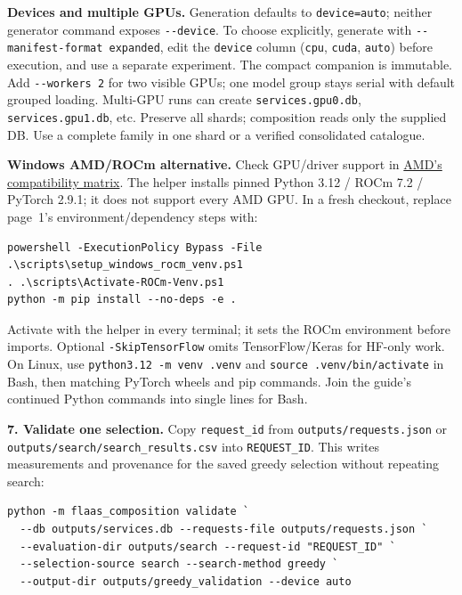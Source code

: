 \documentclass[10pt,a4paper]{article}
\newcommand{\code}[1]{\nolinkurl{#1}}
\newcommand{\lead}[1]{\par\smallskip\noindent\textbf{#1}\enspace}
\begin{document}
\lead{Devices and multiple GPUs.} Generation defaults to \code{device=auto}; neither generator command exposes \code{--device}. To choose explicitly, generate with \code{--manifest-format expanded}, edit the \code{device} column (\code{cpu}, \code{cuda}, \code{auto}) before execution, and use a separate experiment. The compact companion is immutable. Add \code{--workers 2} for two visible GPUs; one model group stays serial with default grouped loading. Multi-GPU runs can create \code{services.gpu0.db}, \code{services.gpu1.db}, etc. Preserve all shards; composition reads only the supplied DB. Use a complete family in one shard or a verified consolidated catalogue.

\lead{Windows AMD/ROCm alternative.} Check GPU/driver support in \href{https://rocm.docs.amd.com/projects/radeon-ryzen/en/latest/docs/compatibility/compatibilityrad/windows/windows_compatibility.html}{AMD's compatibility matrix}. The helper installs pinned Python 3.12 / ROCm 7.2 / PyTorch 2.9.1; it does not support every AMD GPU. In a fresh checkout, replace page~1's environment/dependency steps with:
\begin{lstlisting}
powershell -ExecutionPolicy Bypass -File .\scripts\setup_windows_rocm_venv.ps1
. .\scripts\Activate-ROCm-Venv.ps1
python -m pip install --no-deps -e .
\end{lstlisting}
Activate with the helper in every terminal; it sets the ROCm environment before imports. Optional \code{-SkipTensorFlow} omits TensorFlow/Keras for HF-only work. On Linux, use \code{python3.12 -m venv .venv} and \code{source .venv/bin/activate} in Bash, then matching PyTorch wheels and pip commands. Join the guide's continued Python commands into single lines for Bash.

\lead{7. Validate one selection.} Copy \code{request_id} from \code{outputs/requests.json} or \code{outputs/search/search_results.csv} into \code{REQUEST_ID}. This writes measurements and provenance for the saved greedy selection without repeating search:
\begin{lstlisting}
python -m flaas_composition validate `
  --db outputs/services.db --requests-file outputs/requests.json `
  --evaluation-dir outputs/search --request-id "REQUEST_ID" `
  --selection-source search --search-method greedy `
  --output-dir outputs/greedy_validation --device auto
\end{lstlisting}
\end{document}
